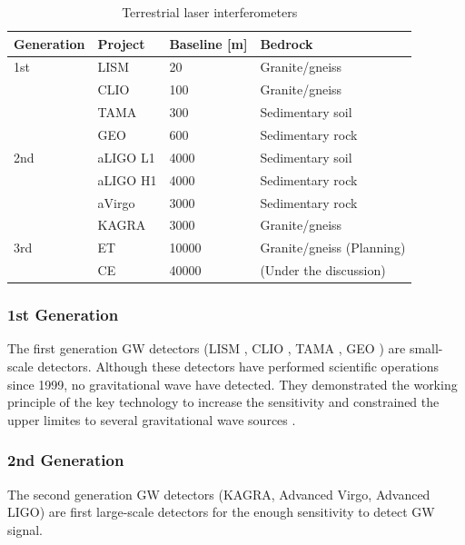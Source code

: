 \begin{table}[h] 
  \begin{center}
    \caption{Terrestrial laser interferometers \cite{chen2017brief,beker2013low}}\label{tb:tb101}
    \begin{tabular}{llll} 
      \hline
      Generation &Project & Baseline [m] & Bedrock \\ \hline \hline
      1st &LISM  & 20    & Granite/gneiss \\ 
      &CLIO  & 100   & Granite/gneiss \\
      &TAMA  & 300   & Sedimentary soil \cite{1970449}\\ 
      &GEO   & 600   & Sedimentary rock \\ \hline
      2nd &aLIGO L1 & 4000  & Sedimentary soil \\
      &aLIGO H1 & 4000  & Sedimentary rock \\
      &aVirgo   & 3000  & Sedimentary rock \\
      &KAGRA   & 3000  & Granite/gneiss \\ \hline
      3rd &ET      & 10000 & Granite/gneiss (Planning) \\
          &CE      & 40000 & (Under the discussion) \\
      \hline
    \end{tabular}
  \end{center}
\end{table}


\subsubsection{1st Generation}
The first generation GW detectors (LISM \cite{sato2004ultrastable}, CLIO \cite{ohashi2003design}, TAMA \cite{ando2001stable}, GEO \cite{grote2010geo}) are small-scale detectors. Although these detectors have performed scientific operations since 1999, no gravitational wave have detected. They demonstrated the working principle of the key technology to increase the sensitivity and constrained the upper limites to several gravitational wave sources \cite{takahashi2004coincidence,Fairhurst2011}.

\subsubsection{2nd Generation}
The second generation GW detectors (KAGRA\cite{akutsu2018kagra}, Advanced Virgo\cite{acernese2014advanced}, Advanced LIGO\cite{aasi2015advanced}) are first large-scale detectors for the enough sensitivity to detect GW signal.

